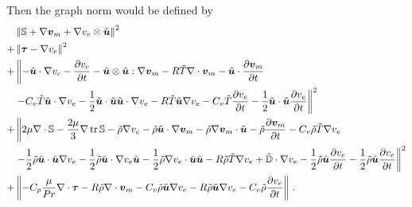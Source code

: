 \documentclass[Proposal.tex]{subfiles}
\begin{document}
Then the graph norm would be defined by
\begin{equation}
\begin{aligned}
&\left\| \mathbb{S}+\nabla\boldsymbol v_m+\nabla v_e\otimes\tilde{\boldsymbol u} \right\|^2\\
+&\left\| \boldsymbol\tau-\nabla v_e \right\|^2\\
+&\left\|
-\tilde{\boldsymbol u}\cdot\nabla v_c-\frac{\partial v_c}{\partial t}-\tilde{\boldsymbol u}\otimes\tilde{\boldsymbol u}:\nabla\boldsymbol v_m
-R\tilde T\nabla\cdot\boldsymbol v_m-\tilde{\boldsymbol u}\cdot\frac{\partial\boldsymbol v_m}{\partial t}\right.\\
&\left.-C_v\tilde T\tilde{\boldsymbol u}\cdot\nabla v_e-\frac{1}{2}\tilde{\boldsymbol u}\cdot\tilde{\boldsymbol u}\tilde{\boldsymbol u}\cdot\nabla v_e
-R\tilde T\tilde{\boldsymbol u}\nabla v_e
-C_v\tilde T\frac{\partial v_e}{\partial t}-\frac{1}{2}\tilde{\boldsymbol u}\cdot\tilde{\boldsymbol u}\frac{\partial v_e}{\partial t}
\right\|^2\\
+&\left\|2\mu\nabla\cdot\mathbb{S}-\frac{2\mu}{3}\nabla\operatorname*{tr}{\mathbb{S}}
-\tilde\rho\nabla v_c
-\tilde\rho\tilde{\boldsymbol u}\cdot\nabla\boldsymbol v_m-\tilde\rho\nabla\boldsymbol v_m\cdot\tilde{\boldsymbol u}
-\tilde\rho\frac{\partial\boldsymbol v_m}{\partial t}
-C_v\tilde\rho\tilde T\nabla v_e\right.\\
&\left.
-\frac{1}{2}\tilde\rho\tilde{\boldsymbol u}\cdot\tilde{\boldsymbol u}\nabla v_e
-\frac{1}{2}\tilde\rho\tilde{\boldsymbol u}\cdot\nabla v_e\tilde{\boldsymbol u}
-\frac{1}{2}\tilde\rho\nabla v_e\cdot\tilde{\boldsymbol u}\tilde{\boldsymbol u}
-R\tilde\rho\tilde T\nabla v_e
+\tilde{\mathbb{D}}\cdot\nabla v_e
-\frac{1}{2}\tilde\rho\tilde{\boldsymbol u}\frac{\partial v_e}{\partial t}
-\frac{1}{2}\tilde\rho\tilde{\boldsymbol u}\frac{\partial v_e}{\partial t}
\right\|^2\\
+&\left\|-C_p\frac{\mu}{Pr}\nabla\cdot\boldsymbol\tau
-R\tilde\rho\nabla\cdot\boldsymbol v_m
-C_v\tilde\rho\tilde{\boldsymbol u}\nabla v_e
-R\tilde\rho\tilde{\boldsymbol u}\nabla v_e
-C_v\tilde\rho\frac{\partial v_e}{\partial t}
\right\|\,.
\end{aligned}
\end{equation}
\end{document}

